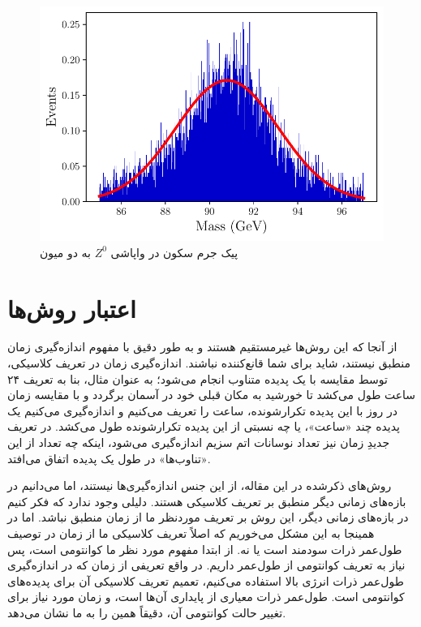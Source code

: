 \documentclass[12pt,a4paper]{article}
\begin{document}
	\begin{figure}[h]
		\centering
		\includegraphics[width=0.9\linewidth]{calculations/z0_peak_mass_hist.pdf}
		\caption{پیک جرم سکون در واپاشی $Z^0$ به دو میون}
	\end{figure}

	\section{اعتبار روش‌ها}
	از آنجا که این روش‌ها غیرمستقیم هستند و به طور دقیق با مفهوم اندازه‌گیری زمان منطبق نیستند، شاید برای شما قانع‌کننده نباشند. اندازه‌گیری زمان در تعریف
	کلاسیکی، توسط مقایسه با یک پدیده متناوب انجام می‌شود؛ به عنوان مثال، بنا به تعریف ۲۴ ساعت طول می‌کشد تا خورشید به مکان قبلی خود در آسمان برگردد و با
	مقایسه زمان در روز با این پدیده تکرارشونده، ساعت را تعریف می‌کنیم و اندازه‌گیری می‌کنیم یک پدیده چند «ساعت»، یا چه نسبتی از این پدیده تکرارشونده
	طول می‌کشد. در تعریف جدیدِ زمان نیز تعداد نوسانات اتم سزیم اندازه‌گیری می‌شود، اینکه چه تعداد از این «تناوب‌ها» در طول یک پدیده اتفاق می‌افتد.
	
	روش‌های ذکرشده در این مقاله، از این جنس اندازه‌گیری‌ها نیستند، اما می‌دانیم در بازه‌های زمانی دیگر منطبق بر تعریف کلاسیکی هستند. دلیلی وجود ندارد
	که فکر کنیم در بازه‌های زمانی	دیگر، این روش بر تعریف موردنظر ما از زمان منطبق نباشد. اما در همینجا به این مشکل می‌خوریم که اصلاً تعریف کلاسیکی
	ما از زمان در توصیف طول‌عمر ذرات سودمند است یا نه. از ابتدا مفهوم مورد نظر ما کوانتومی است، پس نیاز به تعریف کوانتومی از طول‌عمر داریم.
	در واقع تعریفی از زمان که در اندازه‌گیری طول‌عمر ذرات انرژی بالا استفاده می‌کنیم، تعمیم تعریف کلاسیکی آن برای پدیده‌های کوانتومی است.
	طول‌‌عمر ذرات معیاری از پایداری آن‌ها است، و زمان مورد نیاز برای تغییر حالت کوانتومی آن، دقیقاً همین را به ما نشان می‌دهد.
	\setLTRbibitems
	
	
\end{document}
